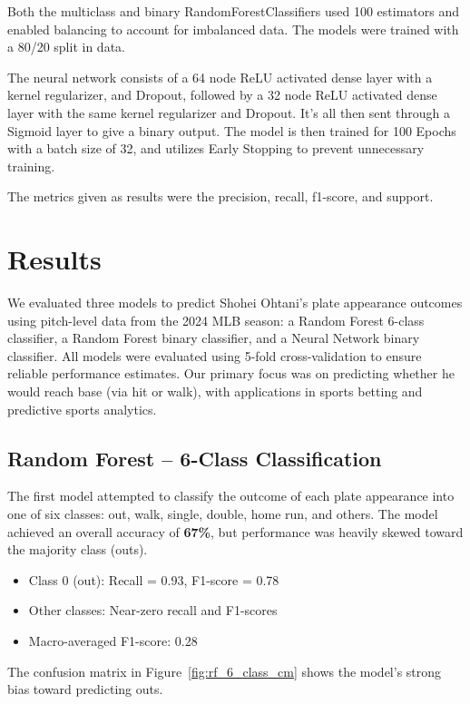 \documentclass[conference]{IEEEtran}
\begin{document}
Both the multiclass and binary RandomForestClassifiers used 100 estimators and enabled balancing to account for imbalanced data. The models were trained with a 80/20 split in data.

The neural network consists of a 64 node ReLU activated dense layer with a kernel regularizer, and Dropout, followed by a 32 node ReLU activated dense layer with the same kernel regularizer and Dropout. It's all then sent through a Sigmoid layer to give a binary output. The model is then trained for 100 Epochs with a batch size of 32, and utilizes Early Stopping to prevent unnecessary training.

The metrics given as results were the precision, recall, f1-score, and support. 

\section{Results}

We evaluated three models to predict Shohei Ohtani’s plate appearance outcomes using pitch-level data from the 2024 MLB season: a Random Forest 6-class classifier, a Random Forest binary classifier, and a Neural Network binary classifier. All models were evaluated using 5-fold cross-validation to ensure reliable performance estimates. Our primary focus was on predicting whether he would reach base (via hit or walk), with applications in sports betting and predictive sports analytics.

\subsection{Random Forest – 6-Class Classification}

The first model attempted to classify the outcome of each plate appearance into one of six classes: out, walk, single, double, home run, and others. The model achieved an overall accuracy of \textbf{67\%}, but performance was heavily skewed toward the majority class (outs).

\begin{itemize}
    \item Class 0 (out): Recall = 0.93, F1-score = 0.78
    \item Other classes: Near-zero recall and F1-scores
    \item Macro-averaged F1-score: 0.28
\end{itemize}

The confusion matrix in Figure~\ref{fig:rf_6_class_cm} shows the model’s strong bias toward predicting outs.
\end{document}
